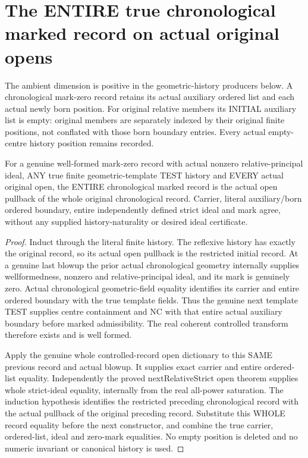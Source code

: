 \section{The ENTIRE true chronological marked record on actual original opens}

The ambient dimension is positive in the geometric-history producers below.
A chronological mark-zero record retains its actual auxiliary ordered list
and each actual newly born position. For original relative members its INITIAL
auxiliary list is empty: original members are separately indexed by their
original finite positions, not conflated with those born boundary entries.
Every actual empty-centre history position remains recorded.

\begin{theorem}
\label{hir:sharp-actual-whole-chronological-open-naturality}
\leanok
For a genuine well-formed mark-zero record with actual nonzero relative-principal
ideal, ANY true finite geometric-template TEST history and EVERY actual original
open, the ENTIRE chronological marked record is the actual open pullback of the
whole original chronological record. Carrier, literal auxiliary/born ordered
boundary, entire independently defined strict ideal and mark agree, without
any supplied history-naturality or desired ideal certificate.
\end{theorem}
\begin{proof}
Induct through the literal finite history. The reflexive history has exactly
the original record, so its actual open pullback is the restricted initial
record. At a genuine last blowup the prior actual chronological geometry
internally supplies wellformedness, nonzero and relative-principal ideal,
and its mark is genuinely zero. Actual chronological geometric-field equality
identifies its carrier and entire ordered boundary with the true template
fields. Thus the genuine next template TEST supplies centre containment and
NC with that entire actual auxiliary boundary before marked admissibility.
The real coherent controlled transform therefore exists and is well formed.

Apply the genuine whole controlled-record open dictionary to this SAME previous
record and actual blowup. It supplies exact carrier and entire ordered-list
equality. Independently the proved nextRelativeStrict open theorem supplies
whole strict-ideal equality, internally from the real all-power saturation.
The induction hypothesis identifies the restricted preceding chronological
record with the actual pullback of the original preceding record. Substitute
this WHOLE record equality before the next constructor, and combine the true
carrier, ordered-list, ideal and zero-mark equalities. No empty position is
deleted and no numeric invariant or canonical history is used.
\end{proof}

